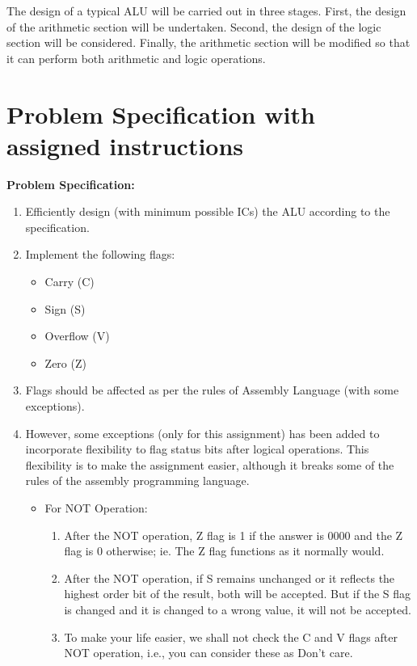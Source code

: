 \documentclass[11pt]{article}
\begin{document}
The design of a typical ALU will be carried out in three stages. First, the design of the 
arithmetic section will be undertaken. Second, the design of the logic section will be considered. 
Finally, the arithmetic section will be modified so that it can perform both arithmetic and logic 
operations.

\section{Problem Specification with assigned instructions}
\textbf{Problem Specification:}
\begin{enumerate}
    \item Efficiently design (with minimum possible ICs) the ALU according to the specification.
    \item Implement the following flags:
    \begin{itemize}
        \item Carry (C)
        \item Sign (S)
        \item Overflow (V)
        \item Zero (Z)
    \end{itemize}
    \item Flags should be affected as per the rules of Assembly Language (with some exceptions).
    \item However, some exceptions (only for this assignment) has been added to incorporate 
    flexibility to flag status bits after logical operations. This flexibility is to 
    make the assignment easier, although it breaks some of the rules of the assembly 
    programming language.
    \begin{itemize}
        \item For NOT Operation:
            \begin{enumerate}
                \item After the NOT operation, Z flag is 1 if the answer is 0000 and the Z flag is 
                0 otherwise; ie. The Z flag functions as it normally would.
                \item After the NOT operation, if S remains unchanged or it reflects the highest 
                order bit of the result, both will be accepted. But if the S flag is changed and 
                it is changed to a wrong value, it will not be accepted.
                \item To make your life easier, we shall not check the C and V flags after NOT 
                operation, i.e., you can consider these as Don’t care.                

\end{enumerate}
\end{itemize}
\end{enumerate}
\end{document}
